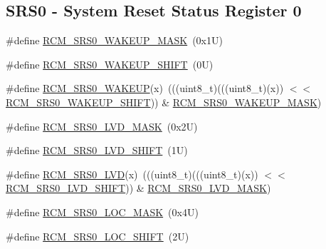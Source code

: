 \subsection*{S\+R\+S0 -\/ System Reset Status Register 0}
\begin{DoxyCompactItemize}
\item 
\#define \mbox{\hyperlink{group___r_c_m___register___masks_gacdeb6976064d599d6cd063b26a25dbda}{R\+C\+M\+\_\+\+S\+R\+S0\+\_\+\+W\+A\+K\+E\+U\+P\+\_\+\+M\+A\+SK}}~(0x1\+U)
\item 
\#define \mbox{\hyperlink{group___r_c_m___register___masks_ga2e140fc50106a6145cffe4b72671bbc2}{R\+C\+M\+\_\+\+S\+R\+S0\+\_\+\+W\+A\+K\+E\+U\+P\+\_\+\+S\+H\+I\+FT}}~(0\+U)
\item 
\#define \mbox{\hyperlink{group___r_c_m___register___masks_gaf1b4c911a4eb41127e9866208f3527c7}{R\+C\+M\+\_\+\+S\+R\+S0\+\_\+\+W\+A\+K\+E\+UP}}(x)~(((uint8\+\_\+t)(((uint8\+\_\+t)(x)) $<$$<$ \mbox{\hyperlink{group___r_c_m___register___masks_ga2e140fc50106a6145cffe4b72671bbc2}{R\+C\+M\+\_\+\+S\+R\+S0\+\_\+\+W\+A\+K\+E\+U\+P\+\_\+\+S\+H\+I\+FT}})) \& \mbox{\hyperlink{group___r_c_m___register___masks_gacdeb6976064d599d6cd063b26a25dbda}{R\+C\+M\+\_\+\+S\+R\+S0\+\_\+\+W\+A\+K\+E\+U\+P\+\_\+\+M\+A\+SK}})
\item 
\#define \mbox{\hyperlink{group___r_c_m___register___masks_ga4de74187b3bcc5b40a526b3ab5afda88}{R\+C\+M\+\_\+\+S\+R\+S0\+\_\+\+L\+V\+D\+\_\+\+M\+A\+SK}}~(0x2\+U)
\item 
\#define \mbox{\hyperlink{group___r_c_m___register___masks_gad3f4cb02d84182ddd0933dc93e1ec4ba}{R\+C\+M\+\_\+\+S\+R\+S0\+\_\+\+L\+V\+D\+\_\+\+S\+H\+I\+FT}}~(1\+U)
\item 
\#define \mbox{\hyperlink{group___r_c_m___register___masks_ga5d394aa5b2a91b5963648d6d33a15411}{R\+C\+M\+\_\+\+S\+R\+S0\+\_\+\+L\+VD}}(x)~(((uint8\+\_\+t)(((uint8\+\_\+t)(x)) $<$$<$ \mbox{\hyperlink{group___r_c_m___register___masks_gad3f4cb02d84182ddd0933dc93e1ec4ba}{R\+C\+M\+\_\+\+S\+R\+S0\+\_\+\+L\+V\+D\+\_\+\+S\+H\+I\+FT}})) \& \mbox{\hyperlink{group___r_c_m___register___masks_ga4de74187b3bcc5b40a526b3ab5afda88}{R\+C\+M\+\_\+\+S\+R\+S0\+\_\+\+L\+V\+D\+\_\+\+M\+A\+SK}})
\item 
\#define \mbox{\hyperlink{group___r_c_m___register___masks_ga0983314adae781518e2481ae518e14d8}{R\+C\+M\+\_\+\+S\+R\+S0\+\_\+\+L\+O\+C\+\_\+\+M\+A\+SK}}~(0x4\+U)
\item 
\#define \mbox{\hyperlink{group___r_c_m___register___masks_ga87c1e113b052d6c10c450973efa74eb7}{R\+C\+M\+\_\+\+S\+R\+S0\+\_\+\+L\+O\+C\+\_\+\+S\+H\+I\+FT}}~(2\+U)

\end{DoxyCompactItemize}
